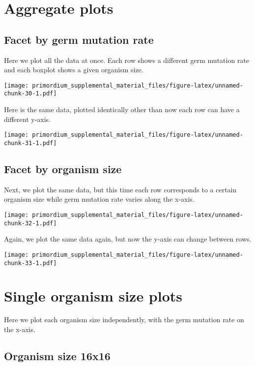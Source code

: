\documentclass[]{book}
\begin{document}
\hypertarget{aggregate-plots-1}{%
\section{Aggregate plots}\label{aggregate-plots-1}}

\hypertarget{facet-by-germ-mutation-rate}{%
\subsection{Facet by germ mutation rate}\label{facet-by-germ-mutation-rate}}

Here we plot all the data at once.
Each row shows a different germ mutation rate and each boxplot shows a given organism size.

\texttt{[image: primordium\_supplemental\_material\_files/figure-latex/unnamed-chunk-30-1.pdf]}

Here is the same data, plotted identically other than now each row can have a different y-axis.

\texttt{[image: primordium\_supplemental\_material\_files/figure-latex/unnamed-chunk-31-1.pdf]}

\hypertarget{facet-by-organism-size-1}{%
\subsection{Facet by organism size}\label{facet-by-organism-size-1}}

Next, we plot the same data, but this time each row corresponds to a certain organism size while germ mutation rate varies along the x-axis.

\texttt{[image: primordium\_supplemental\_material\_files/figure-latex/unnamed-chunk-32-1.pdf]}

Again, we plot the same data again, but now the y-axis can change between rows.

\texttt{[image: primordium\_supplemental\_material\_files/figure-latex/unnamed-chunk-33-1.pdf]}

\hypertarget{single-organism-size-plots-1}{%
\section{Single organism size plots}\label{single-organism-size-plots-1}}

Here we plot each organism size independently, with the germ mutation rate on the x-axis.

\hypertarget{organism-size-16x16-1}{%
\subsection{Organism size 16x16}\label{organism-size-16x16-1}}
\end{document}
